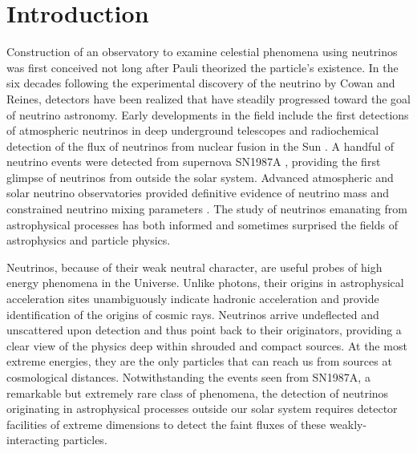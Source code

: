 
\section{Introduction}
\label{sec:intro}

Construction of an observatory to examine celestial phenomena using
neutrinos was first conceived not long after Pauli theorized the
particle's existence.  In the six decades following the experimental
discovery of the neutrino by Cowan and Reines, detectors have been realized
that have steadily progressed toward the goal of neutrino
astronomy.  Early developments in the field include the first detections of
atmospheric neutrinos in deep underground telescopes \cite{Achar,Witwatersrand} and
radiochemical detection of the flux of neutrinos from
nuclear fusion in the Sun \cite{Homestake}. A handful of neutrino
events were detected from supernova SN1987A
\cite{SK1987A,IMB1987A,BUST1987A}, providing the first glimpse of neutrinos
from outside the solar system.  Advanced
atmospheric and solar neutrino observatories provided definitive
evidence of neutrino mass and constrained neutrino mixing
parameters \cite{SK,SNO}.  The study of neutrinos emanating from astrophysical
processes has both informed and sometimes surprised the fields of
astrophysics and particle physics. 

Neutrinos, because of their weak neutral character, are useful probes of high
energy phenomena in the Universe. Unlike photons, their origins in astrophysical
acceleration sites unambiguously indicate hadronic acceleration and
provide identification of the origins of cosmic rays. Neutrinos arrive 
undeflected and unscattered upon detection and thus point back to their
originators, providing
a clear view of the physics deep within shrouded and compact sources. At
the most extreme energies, they are the only particles that can reach 
us from sources at cosmological distances. Notwithstanding the events seen from SN1987A, a remarkable but
extremely rare class of phenomena, the detection of neutrinos originating in
astrophysical processes outside our solar system requires detector facilities of
extreme dimensions to detect the faint fluxes of these weakly-interacting
particles. 

